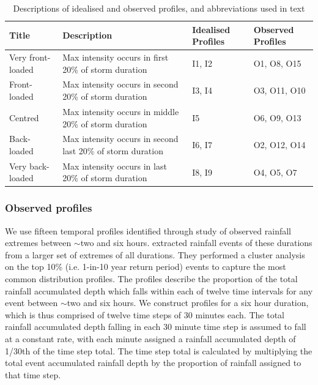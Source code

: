 \documentclass[APA,Times2COL]{WileyNJDv5}
\begin{document}
\begingroup
\setlength\tabcolsep{0pt}
\renewcommand{\arraystretch}{1.5} %
\begin{table}[h!]
\centering
\caption{Descriptions of idealised and observed profiles, and abbreviations used in text}
\begin{tabular}{C{3cm}C{8cm}C{3cm}C{3cm}} 
 \hline
 \textbf{Title} & \textbf{Description} & \textbf{Idealised Profiles} & \textbf{Observed Profiles} \\ [0.5ex] 
 \hline
 Very front-loaded & Max intensity occurs in first 20\% of storm duration & I1, I2 & O1, O8, O15\\
 Front-loaded & Max intensity occurs in second 20\% of storm duration & I3, I4 & O3, O11, O10 \\
 Centred & Max intensity occurs in middle 20\% of storm duration & I5 & O6, O9, O13\\
 Back-loaded & Max intensity occurs in second last 20\% of storm duration & I6, I7 & O2, O12, O14\\
 Very back-loaded & Max intensity occurs in last 20\% of storm duration & I8, I9 & O4, O5, O7\\[1ex] 
 \hline
\end{tabular}
\label{table:profile_names}
\end{table}
\endgroup

\subsubsection{Observed profiles}\label{subsubsec:observed}
We use fifteen temporal profiles identified through study of observed rainfall extremes between $\sim$two and six hours. \citet{villalobos2023towards} extracted rainfall events of these durations from a larger set of extremes of all durations. They performed a cluster analysis on the top 10\% (i.e. 1-in-10 year return period) events to capture the most common distribution profiles. The profiles describe the proportion of the total rainfall accumulated depth which falls within each of twelve time intervals for any event between $\sim$two and six hours. We construct profiles for a six hour duration, which is thus comprised of twelve time steps of 30 minutes each. The total rainfall accumulated depth falling in each 30 minute time step is assumed to fall at a constant rate, with each minute assigned a rainfall accumulated depth of 1/30th of the time step total. The time step total is calculated by multiplying the total event accumulated rainfall depth by the proportion of rainfall assigned to that time step. 
\end{document}
